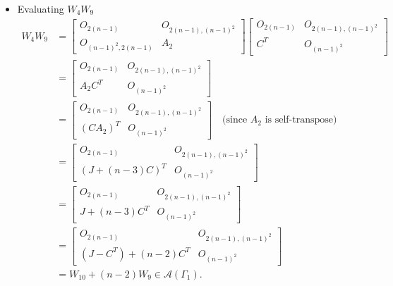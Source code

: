 \begin{itemize}
    \item Evaluating $W_4W_9$
    \begin{align*}
        W_4W_9
        &= \begin{bmatrix}
            O_{2(n-1)} & O_{2(n-1), (n-1)^2} \\
            O_{(n-1)^2, 2(n-1)} & A_2
        \end{bmatrix}\begin{bmatrix}
            O_{2(n-1)} & O_{2(n-1), (n-1)^2} \\
            C^T & O_{(n-1)^2}
        \end{bmatrix}\\
        &= \begin{bmatrix}
            O_{2(n-1)} & O_{2(n-1), (n-1)^2} \\
            A_2C^T & O_{(n-1)^2}
        \end{bmatrix}\\ 
        &= \begin{bmatrix}
            O_{2(n-1)} & O_{2(n-1), (n-1)^2} \\
            (CA_2)^T & O_{(n-1)^2}
        \end{bmatrix}\quad\text{(since } A_2\text{ is self-transpose)}\\
        &= \begin{bmatrix}
            O_{2(n-1)} & O_{2(n-1), (n-1)^2} \\
            (J + (n-3)C)^T & O_{(n-1)^2}
        \end{bmatrix}\\
        &= \begin{bmatrix}
            O_{2(n-1)} & O_{2(n-1), (n-1)^2} \\
            J + (n-3)C^T & O_{(n-1)^2}
        \end{bmatrix}\\
        &= \begin{bmatrix}
            O_{2(n-1)} & O_{2(n-1), (n-1)^2} \\
            (J-C^T) + (n-2)C^T & O_{(n-1)^2}
        \end{bmatrix}\\
        &= W_{10} + (n-2)W_9\in\mathcal{A}(\Gamma_1).
    \end{align*}
    

\end{itemize}
